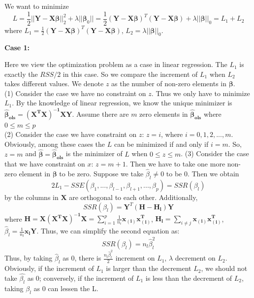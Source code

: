 \documentclass{article}
\begin{document}
\begin{appendices}
	

		We want to minimize
		\begin{equation*}
		L=\frac{1}{2}||\mathbf{Y-X}\bm{\beta}||^2_2+\lambda||\bm{\beta}_0||=\frac{1}{2}(\mathbf{Y-X}\bm{\beta})^T(\mathbf{Y-X}\bm{\beta})+\lambda ||\bm{\beta}||_0=L_1+L_2
		\end{equation*} 
		where $L_1=\frac{1}{2}(\mathbf{Y-X}\bm{\beta})^T(\mathbf{Y-X}\bm{\beta})$, $L_2=\lambda ||\bm{\beta}||_0$. 
	
	\textbf{Case 1:}\par 
	 Here we view the optimization problem as a case in linear regression. 
	The $L_1$ is exactly the $RSS/2$ in this case. So we compare the increment of $L_1$  when $L_2$ takes different values. We denote $z$ as the number of  non-zero elements in $\bm{\beta}$.\\
	(1) Consider the case we have no constraint on $z$. Thus we only have to minimize $L_1$. By the knowledge of linear regression, we know the unique minimizer is $\bm{\hat{\beta}_{ols}}=\mathbf{(X^TX)^{-1}XY}$. Assume there are $m$ zero elements in $\bm{\hat{\beta}_{ols}}$ where $0\leq m \leq p$ \\
	(2) Consider the case we have constraint on $z$: $z = i$, where $i=0,1,2,...,m$. Obviously, among these cases the $L$ can be minimized if and only if $i=m$. So, $z=m$ and $\bm{\hat{\beta}}=\bm{\hat{\beta}_{ols}}$ is the minimizer of $L$ when $0\leq z\leq m$.
	(3) Consider the case that we have constraint on $x$: $z=m+1$. Then we have to take one more non-zero element in $\bm{\beta}$ to be zero. Suppose we take $\hat{\beta}_l \neq 0$ to be 0. Then we obtain 
	\begin{equation*}
		2L_1 -SSE(\beta_1,...,\beta_{l-1},\beta_{l+1},...,\beta_p)=SSR(\beta_l)
	\end{equation*}
	by the columns in $\mathbf{X}$ are orthogonal to each other. Additionally,
	\begin{equation*}
		SSR(\beta_l) = \mathbf{Y}^T(\mathbf{H-H_l})\mathbf{Y} 
	\end{equation*}
	where $\mathbf{H=X(X^TX)^{-1}X}=\sum_{i=1}^p\frac{1}{n_i}\mathbf{x_{(i)}x_{(i)}^T}$, $\mathbf{H_l} = \sum_{i\neq j}\mathbf{x_{(i)}x_{(i)}^T}$, $\hat{\beta}_l = \frac{1}{n_l}\mathbf{x_{l}Y}$. Thus, we can simplify the second equation as:
	\begin{equation*}
		SSR(\beta_l) = n_l\hat{\beta}_l^2
	\end{equation*}
	Thus, by taking $\hat{\beta}_l$ as 0, there is $\frac{n_l\hat{\beta}_l^2}{2}$ increment on $L_1$, $\lambda$ decrement on $L_2$. Obviously, if the increment of $L_1$ is larger than the decrement $L_2$, we should not take $\hat{\beta_l}$ as 0; conversely, if the increment of $L_1$ is less than the decrement of $L_2$, taking $\hat{\beta_l}$ as 0 can lessen the L.\\

\end{appendices}
\end{document}
